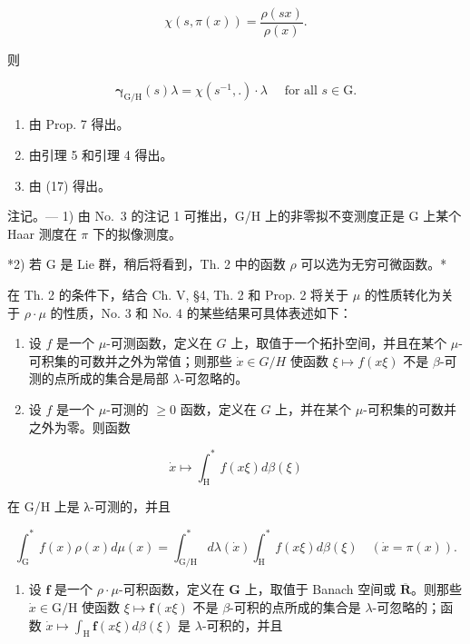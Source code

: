 \[
\chi (s, \pi (x)) = \frac {\rho (s x)}{\rho (x)}.\tag{19}
\]

则

\[
\boldsymbol {\gamma} _ {\mathrm{G/H}} (s) \lambda = \chi (s ^ {- 1},.) \cdot \lambda \quad \text {   for   all   } s \in \mathrm{G}.\tag{20}
\]

\begin{enumerate}
\def\labelenumi{\alph{enumi})}
\item
  由 Prop. 7 得出。
\item
  由引理 5 和引理 4 得出。
\item
  由 (17) 得出。
\end{enumerate}

注记。--- 1) 由 No.~3 的注记 1 可推出，G/H 上的非零拟不变测度正是 G 上某个 Haar 测度在 \(\pi\) 下的拟像测度。

*2) 若 G 是 Lie 群，稍后将看到，Th. 2 中的函数 \(\rho\) 可以选为无穷可微函数。*

在 Th. 2 的条件下，结合 Ch. V, §4, Th. 2 和 Prop. 2 将关于 \(\mu\) 的性质转化为关于 \(\rho \cdot \mu\) 的性质，No. 3 和 No. 4 的某些结果可具体表述如下：

\begin{enumerate}
\def\labelenumi{\alph{enumi})}
\item
  设 \(f\) 是一个 \(\mu\)-可测函数，定义在 \(G\) 上，取值于一个拓扑空间，并且在某个 \(\mu\)-可积集的可数并之外为常值；则那些 \(\dot{x} \in G / H\) 使函数 \(\xi \mapsto f(x\xi)\) 不是 \(\beta\)-可测的点所成的集合是局部 \(\lambda\)-可忽略的。
\item
  设 \(f\) 是一个 \(\mu\)-可测的 \(\geqslant 0\) 函数，定义在 \(G\) 上，并在某个 \(\mu\)-可积集的可数并之外为零。则函数
\end{enumerate}

\[
\dot {x} \mapsto \int_ {\mathrm{H}} ^ {*} f (x \xi) d \beta (\xi)
\]

在 G/H 上是 λ-可测的，并且

\[
\int_ {\mathrm{G}} ^ {*} f (x) \rho (x) d \mu (x) = \int_ {\mathrm{G} / \mathrm{H}} ^ {*} d \lambda (\dot {x}) \int_ {\mathrm{H}} ^ {*} f (x \xi) d \beta (\xi) \quad (\dot {x} = \pi (x)).
\]

\begin{enumerate}
\def\labelenumi{\alph{enumi})}
\setcounter{enumi}{2}
\tightlist
\item
  设 \(\mathbf{f}\) 是一个 \(\rho \cdot \mu\)-可积函数，定义在 \(\mathbf{G}\) 上，取值于 Banach 空间或 \(\overline{\mathbf{R}}\)。则那些 \(\dot{x} \in \mathrm{G} / \mathrm{H}\) 使函数 \(\xi \mapsto \mathbf{f}(x\xi)\) 不是 \(\beta\)-可积的点所成的集合是 \(\lambda\)-可忽略的；函数 \(\dot{x} \mapsto \int_{\mathrm{H}} \mathbf{f}(x\xi) d\beta(\xi)\) 是 \(\lambda\)-可积的，并且
\end{enumerate}

